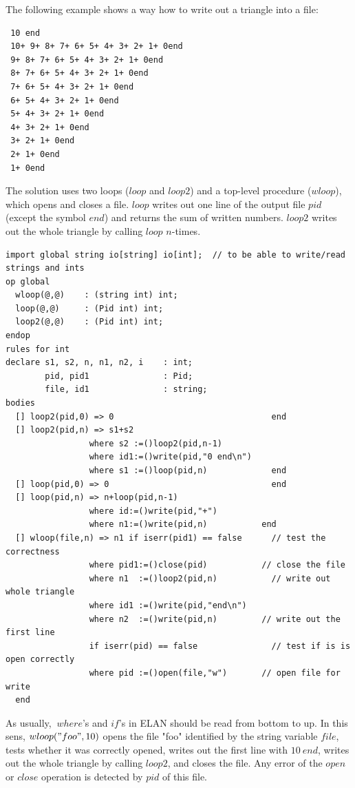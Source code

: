 \documentclass{article}
\begin{document}
{The following example shows a way how to write out a triangle into a file:
{\scriptsize
\begin{verbatim}
 10 end 
 10+ 9+ 8+ 7+ 6+ 5+ 4+ 3+ 2+ 1+ 0end 
 9+ 8+ 7+ 6+ 5+ 4+ 3+ 2+ 1+ 0end 
 8+ 7+ 6+ 5+ 4+ 3+ 2+ 1+ 0end 
 7+ 6+ 5+ 4+ 3+ 2+ 1+ 0end 
 6+ 5+ 4+ 3+ 2+ 1+ 0end 
 5+ 4+ 3+ 2+ 1+ 0end 
 4+ 3+ 2+ 1+ 0end 
 3+ 2+ 1+ 0end 
 2+ 1+ 0end 
 1+ 0end 
\end{verbatim}
}
%
The solution uses two loops ($loop$ and $loop2$) and a top-level
procedure ($wloop$), which opens and closes a file.
$loop$ writes out one line of the output file $pid$ (except the symbol $end$) and 
returns the sum of written numbers. $loop2$ writes out the whole
triangle by calling $loop$ $n$-times.
%
{\scriptsize
\begin{verbatim}
import global string io[string] io[int];  // to be able to write/read strings and ints
op global
  wloop(@,@)    : (string int) int;
  loop(@,@)     : (Pid int) int;
  loop2(@,@)    : (Pid int) int;
endop
rules for int
declare s1, s2, n, n1, n2, i    : int;
        pid, pid1               : Pid;
        file, id1               : string;
bodies
  [] loop2(pid,0) => 0                                end
  [] loop2(pid,n) => s1+s2
                 where s2 :=()loop2(pid,n-1)
                 where id1:=()write(pid,"0 end\n")             
                 where s1 :=()loop(pid,n)             end
  [] loop(pid,0) => 0                                 end
  [] loop(pid,n) => n+loop(pid,n-1) 
                 where id:=()write(pid,"+")
                 where n1:=()write(pid,n)           end
  [] wloop(file,n) => n1 if iserr(pid1) == false      // test the correctness
                 where pid1:=()close(pid)           // close the file
                 where n1  :=()loop2(pid,n)           // write out whole triangle
                 where id1 :=()write(pid,"end\n")
                 where n2  :=()write(pid,n)         // write out the first line
                 if iserr(pid) == false               // test if is is open correctly
                 where pid :=()open(file,"w")       // open file for write
  end
\end{verbatim}
}
%
As usually, $~where$'s and $if$'s in ELAN should be read from bottom to
up. In this sens, $wloop("foo",10)$ opens the file "foo" identified by
the string variable $file$,
tests whether it was correctly opened, writes out the first line 
with $10~end$, writes out the whole triangle by calling $loop2$, 
and closes the file. Any error of the $open$ or $close$ operation is detected
by $pid$ of this file.

}
\end{document}
